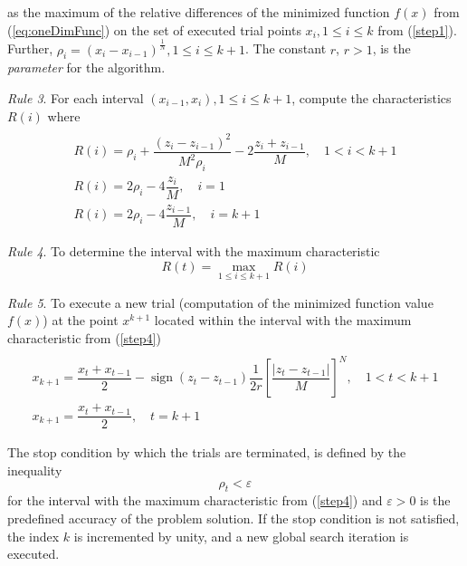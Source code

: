 \documentclass{gOMS2e}
\theoremstyle{plain}%
\theoremstyle{definition}
\DeclareMathOperator{\sign}{sign}
\theoremstyle{remark}
\begin{document}
as the maximum of the relative differences of the minimized function \(f(x)\) from (\ref{eq:oneDimFunc})
on the set of executed trial points \(x_i,1\leqslant i\leqslant k\) from (\ref{step1}). Further, \(\rho_i=(x_i-x_{i-1})^\frac{1}{N},1\leqslant i\leqslant k+1\).
The constant \(r\), \(r>1\), is the \textit{parameter} for the algorithm.
\par
\textit{Rule 3}. For each interval \((x_{i-1},x_i),1\leqslant i\leqslant k+1\), compute the characteristics \(R(i)\) where
\begin{equation}
\label{step3}
\begin{array}{cr}\\
  R(i)=\rho_i+\dfrac{(z_i-z_{i-1})^2}{M^2\rho_i}-2\dfrac{z_i+z_{i-1}}{M},\quad 1<i<k+1 \\
  R(i)=2\rho_i-4\dfrac{z_i}{M},\quad i=1 \\
  R(i)=2\rho_{i}-4\dfrac{z_{i-1}}{M},\quad i=k+1
\end{array}
\end{equation}
\par
\textit{Rule 4}. To determine the interval with the maximum characteristic
\begin{equation}
\label{step4}
R(t)=\max_{1\leqslant i \leqslant k+1}R(i)
\end{equation}
\par
\textit{Rule 5}. To execute a new trial (computation of the minimized function value \(f(x)\))
at the point \(x^{k+1}\) located within the interval with the maximum characteristic from (\ref{step4})
\begin{equation}
\label{step5}
\begin{array}{cr}\\
  x_{k+1}=\dfrac{x_t+x_{t-1}}{2}-\sign(z_{t}-z_{t-1})\dfrac{1}{2r}\left[\dfrac{|z_{t}-z_{t-1}|}{M}\right]^N,\quad 1<t<k+1 \\
  x_{k+1}=\dfrac{x_t+x_{t-1}}{2},\quad t=k+1
\end{array}
\end{equation}
\par
The stop condition by which the trials are terminated, is defined by the inequality
\begin{equation}
  \label{eq:stop}
\rho_t<\varepsilon
\end{equation}
for the interval with the maximum characteristic from (\ref{step4}) and \(\varepsilon >0\) is the predefined
accuracy of the problem solution. If the stop condition is not satisfied, the index \(k\) is incremented by unity,
and a new global search iteration is executed.
\end{document}
